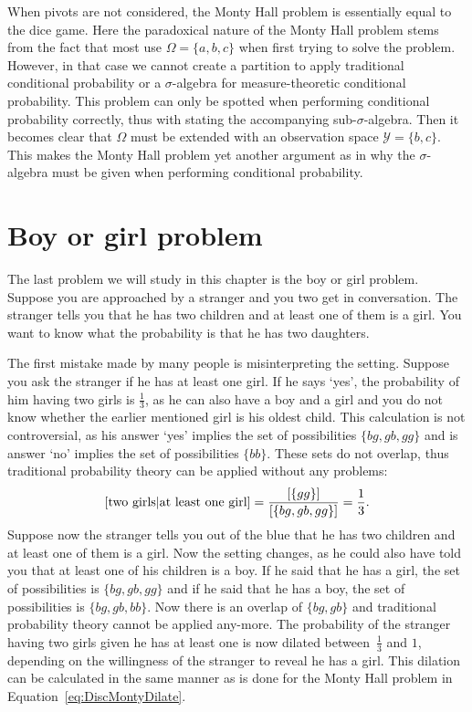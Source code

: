 \documentclass[a4paper]{report}
\theoremstyle{plain}
\theoremstyle{definition}
\theoremstyle{remark}
\numberwithin{equation}{chapter}
\let\P\relax
\DeclareMathOperator{\P}{\mathbb{P}}
\DeclareMathOperator{\1}{\mathbbm{1}}
\newcommand{\Y}{\mathcal{Y}}
\begin{document}
When pivots are not considered, the Monty Hall problem is essentially equal to the dice game. Here the paradoxical nature of the Monty Hall problem stems from the fact that most use $\Omega=\{a,b,c\}$ when first trying to solve the problem. However, in that case we cannot create a partition to apply traditional conditional probability or a $\sigma$-algebra for measure-theoretic conditional probability. This problem can only be spotted when performing conditional probability correctly, thus with stating the accompanying sub-$\sigma$-algebra. Then it becomes clear that $\Omega$ must be extended with an observation space $\Y=\{b,c\}$. This makes the Monty Hall problem yet another argument as in why the $\sigma$-algebra must be given when performing conditional probability.

\section{Boy or girl problem}\label{sec:DiscChildren}
The last problem we will study in this chapter is the boy or girl problem. Suppose you are approached by a stranger and you two get in conversation. The stranger tells you that he has two children and at least one of them is a girl. You want to know what the probability is that he has two daughters.

The first mistake made by many people is misinterpreting the setting. Suppose you ask the stranger if he has at least one girl. If he says `yes', the probability of him having two girls is $\frac{1}{3}$, as he can also have a boy and a girl and you do not know whether the earlier mentioned girl is his oldest child. This calculation is not controversial, as his answer `yes' implies the set of possibilities $\{bg, gb, gg\}$ and is answer `no' implies the set of possibilities $\{bb\}$. These sets do not overlap, thus traditional probability theory can be applied without any problems:
\begin{equation}
\P[\text{two girls}|\text{at least one girl}]=\frac{\P[\{gg\}]}{\P[\{bg, gb, gg\}]}=\frac{1}{3}.
\end{equation}
Suppose now the stranger tells you out of the blue that he has two children and at least one of them is a girl. Now the setting changes, as he could also have told you that at least one of his children is a boy. If he said that he has a girl, the set of possibilities is $\{bg, gb, gg\}$ and if he said that he has a boy, the set of possibilities is $\{bg, gb, bb\}$. Now there is an overlap of $\{bg, gb\}$ and traditional probability theory cannot be applied any-more. The probability of the stranger having two girls given he has at least one is now dilated between~$\frac{1}{3}$ and $1$, depending on the willingness of the stranger to reveal he has a girl. This dilation can be calculated in the same manner as is done for the Monty Hall problem in Equation~\ref{eq:DiscMontyDilate}.
\end{document}

